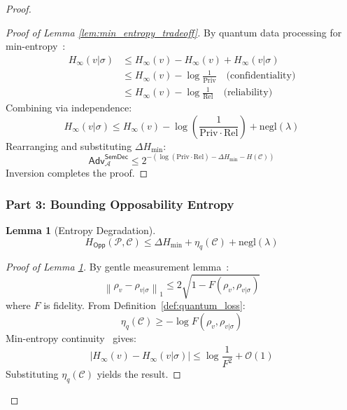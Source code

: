 \documentclass[preprint,12pt]{elsarticle}
\newtheorem{lemma}{Lemma}[section]
\newcommand{\negl}{\mathrm{negl}}
\newcommand{\Adv}{\mathsf{Adv}}
\begin{document}
\begin{proof}
                        \begin{proof}[Proof of Lemma \ref{lem:min_entropy_tradeoff}]
                            By quantum data processing for min-entropy~\cite[Theorem 3.2.3]{Renner2005}: %
                            \begin{align*}
                                H_\infty(v | \sigma) &\leq H_\infty(v) - H_\infty(v) + H_\infty(v | \sigma) \\
                                &\leq H_\infty(v) - \log \frac{1}{\mathrm{Priv}} \quad \text{(confidentiality)} \\
                                &\leq H_\infty(v) - \log \frac{1}{\mathrm{Rel}} \quad \text{(reliability)}
                            \end{align*}
                            Combining via independence:
                            \[
                            H_\infty(v | \sigma) \leq H_\infty(v) - \log \left( \frac{1}{\mathrm{Priv} \cdot \mathrm{Rel}} \right) + \negl(\lambda)
                            \]
                            Rearranging and substituting $\Delta H_{\text{min}}$:
                            \[
                            \Adv^{\mathsf{SemDec}}_{\mathcal{A}} \leq 2^{-\left( \log(\mathrm{Priv} \cdot \mathrm{Rel}) - \Delta H_{\text{min}} - H(\mathcal{C}) \right)}
                            \]
                            Inversion completes the proof.
                        \end{proof}

                    \subsubsection{Part 3: Bounding Opposability Entropy}
                        \begin{lemma}[Entropy Degradation]\label{lem:entropy_degradation}
                            \[
                            H_{\mathsf{Opp}}(\mathcal{P}, \mathcal{C}) \leq \Delta H_{\text{min}} + \eta_q(\mathcal{C}) + \negl(\lambda)
                            \]
                        \end{lemma}

                        \begin{proof}[Proof of Lemma \ref{lem:entropy_degradation}]
                            By gentle measurement lemma~\cite[Lemma 9.4.1]{Wilde2017}: 
                            \[
                            \left\| \rho_v - \rho_{v|\sigma} \right\|_1 \leq 2\sqrt{1 - F(\rho_v, \rho_{v|\sigma})}
                            \]
                            where $F$ is fidelity. From Definition~\ref{def:quantum_loss}:
                            \[
                            \eta_q(\mathcal{C}) \geq -\log F(\rho_v, \rho_{v|\sigma})
                            \]
                            Min-entropy continuity~\cite[Theorem 3.3.3]{Renner2005} gives:
                            \[
                            \left| H_\infty(v) - H_\infty(v|\sigma) \right| \leq \log \frac{1}{F^2} + \mathcal{O}(1)
                            \]
                            Substituting $\eta_q(\mathcal{C})$ yields the result.
                        \end{proof}


\end{proof}
\end{document}
